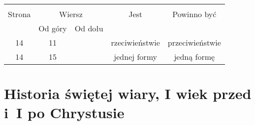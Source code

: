 \documentclass[a4paper,11pt]{article}
\begin{document}



\begin{center}

  \begin{tabular}{|c|c|c|c|c|}
    \hline
    & \multicolumn{2}{c|}{} & & \\
    Strona & \multicolumn{2}{c|}{Wiersz} & Jest
                              & Powinno być \\ \cline{2-3}
    & Od góry & Od dołu & & \\
    \hline
    14 & 11 & & rzeciwieństwie & przeciwieństwie \\
    14 & 15 & & jednej formy & jedną formę \\
    \hline
  \end{tabular}

\end{center}

\vspace{\spaceTwo}










\section{Historia świętej wiary, I wiek przed i~I po Chrystusie}

\vspace{\spaceTwo}





\end{document}
